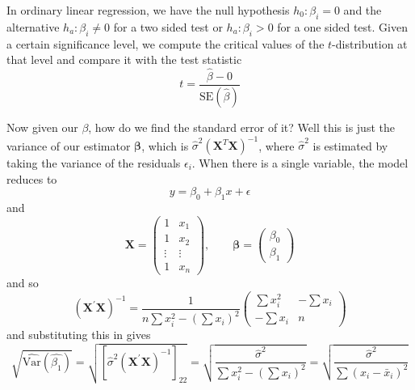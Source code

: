   In ordinary linear regression, we have the null hypothesis $h_0 : \beta_i = 0$ and the alternative $h_a : \beta_i \neq 0$ for a two sided test or $h_a : \beta_i > 0$ for a one sided test. Given a certain significance level, we compute the critical values of the $t$-distribution at that level and compare it with the test statistic 
  \[t = \frac{\hat{\beta} - 0}{\mathrm{SE}(\hat{\beta})}\]

  Now given our $\beta$, how do we find the standard error of it? Well this is just the variance of our estimator $\boldsymbol{\beta}$, which is $\hat{\sigma}^2 (\mathbf{X}^T \mathbf{X})^{-1}$, where $\hat{\sigma}^2$ is estimated by taking the variance of the residuals $\epsilon_i$. When there is a single variable, the model reduces to 
  \[y = \beta_0 + \beta_1 x + \epsilon\]
  and 
  \[\mathbf{X} = \left(
  \begin{array}{cc}
  1 & x_1 \\
  1 & x_2 \\
  \vdots & \vdots \\
  1 & x_n
  \end{array}
  \right), \qquad \boldsymbol{\beta} = \left(
  \begin{array}{c}
  \beta_0 \\ \beta_1 
  \end{array}
  \right)\]
  and so 
  \[(\mathbf{X}^{\prime} \mathbf{X})^{-1} = \frac{1}{n\sum x_i^2 - (\sum x_i)^2} 
  \left(
  \begin{array}{cc}
  \sum x_i^2 & -\sum x_i \\
  -\sum x_i  & n
  \end{array}
  \right)\]
  and substituting this in gives 
  \[\sqrt{\widehat{\textrm{Var}}(\hat{\beta_1})} = \sqrt{[\hat{\sigma}^2  (\mathbf{X}^{\prime} \mathbf{X})^{-1}]_{22}} = \sqrt{\frac{\hat{\sigma}^2}{\sum x_i^2 - (\sum x_i)^2}} = \sqrt{\frac{\hat{\sigma}^2}{\sum (x_i - \bar{x}_i)^2}}\]

